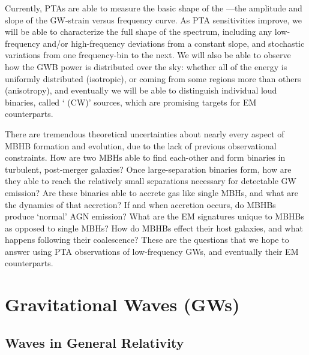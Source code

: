 \documentclass[onecolumn,authoryear]{els-mrw}
\begin{document}
Currently, PTAs are able to measure the basic shape of the ---the amplitude and slope of the GW-strain versus frequency curve.  As PTA sensitivities improve, we will be able to characterize the full shape of the spectrum, including any low-frequency and/or high-frequency deviations from a constant slope, and stochastic variations from one frequency-bin to the next.  We will also be able to observe how the GWB power is distributed over the sky: whether all of the energy is uniformly distributed (isotropic), or coming from some regions more than others (anisotropy), and eventually we will be able to distinguish individual loud binaries, called ` (CW)' sources, which are promising targets for EM counterparts.

There are tremendous theoretical uncertainties about nearly every aspect of MBHB formation and evolution, due to the lack of previous observational constraints.  How are two MBHs able to find each-other and form binaries in turbulent, post-merger galaxies?  Once large-separation binaries form, how are they able to reach the relatively small separations necessary for detectable GW emission?  Are these binaries able to accrete gas like single MBHs, and what are the dynamics of that accretion?  If and when accretion occurs, do MBHBs produce `normal' AGN emission?  What are the EM signatures unique to MBHBs as opposed to single MBHs?  How do MBHBs effect their host galaxies, and what happens following their coalescence?  These are the questions that we hope to answer using PTA observations of low-frequency GWs, and eventually their EM counterparts.



\section{Gravitational Waves (GWs)}\label{sec:gws}

\subsection{Waves in General Relativity}\label{sec:gws_gr-waves}

\end{document}
